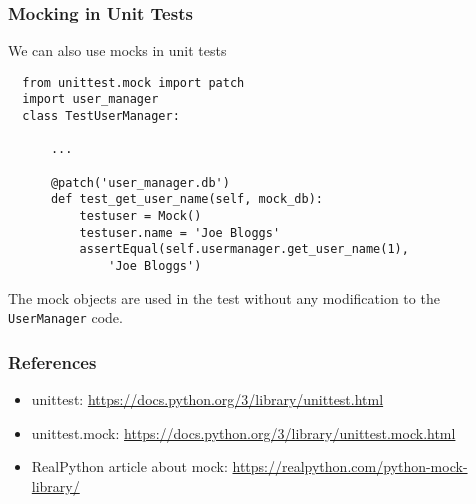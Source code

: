 \documentclass[10pt]{beamer}
\begin{document}
\begin{frame}[fragile]
  \frametitle{Mocking in Unit Tests}
  
  We can also use mocks in unit tests
  
  \begin{verbatim}
  from unittest.mock import patch
  import user_manager
  class TestUserManager:
      
      ...
      
      @patch('user_manager.db')
      def test_get_user_name(self, mock_db):
          testuser = Mock()
          testuser.name = 'Joe Bloggs'
          assertEqual(self.usermanager.get_user_name(1),
              'Joe Bloggs')                     
  \end{verbatim} 
  
  The mock objects are used in the test without any modification to the \texttt{UserManager} code.
   
\end{frame}

\begin{frame}
  \frametitle{References}
  
  \begin{itemize}
    \item unittest: \url{https://docs.python.org/3/library/unittest.html}
    \item unittest.mock: \url{https://docs.python.org/3/library/unittest.mock.html}
    \item RealPython article about mock: \url{https://realpython.com/python-mock-library/}
  \end{itemize}      
\end{frame}
\end{document}
